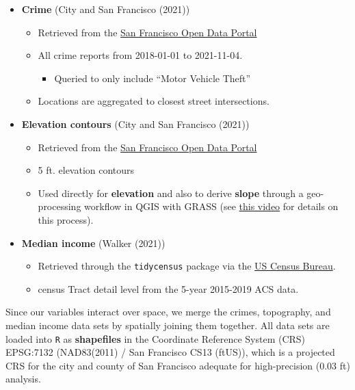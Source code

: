 \documentclass[
]{article}
\providecommand{\tightlist}{%
  \setlength{\itemsep}{0pt}\setlength{\parskip}{0pt}}
\begin{document}
\begin{itemize}
\tightlist
\item
  \textbf{Crime} (City and San Francisco (2021))

  \begin{itemize}
  \tightlist
  \item
    Retrieved from the
    \href{https://data.sfgov.org/Public-Safety/Police-Department-Incident-Reports-2018-to-Present/wg3w-h783}{San
    Francisco Open Data Portal}
  \item
    All crime reports from 2018-01-01 to 2021-11-04.

    \begin{itemize}
    \tightlist
    \item
      Queried to only include ``Motor Vehicle Theft''
    \end{itemize}
  \item
    Locations are aggregated to closest street intersections.
  \end{itemize}
\item
  \textbf{Elevation contours} (City and San Francisco (2021))

  \begin{itemize}
  \tightlist
  \item
    Retrieved from the
    \href{https://data.sfgov.org/Energy-and-Environment/Elevation-Contours/rnbg-2qxw}{San
    Francisco Open Data Portal}
  \item
    5 ft. elevation contours
  \item
    Used directly for \textbf{elevation} and also to derive
    \textbf{slope} through a geo-processing workflow in QGIS with GRASS
    (see \href{https://www.youtube.com/watch?v=MvnW6w1_yJg}{this video}
    for details on this process).
  \end{itemize}
\item
  \textbf{Median income} (Walker (2021))

  \begin{itemize}
  \tightlist
  \item
    Retrieved through the \texttt{tidycensus} package via the
    \href{https://www.census.gov/data/developers/data-sets.html}{US
    Census Bureau}.
  \item
    census Tract detail level from the 5-year 2015-2019 ACS data.
  \end{itemize}
\end{itemize}

Since our variables interact over space, we merge the crimes,
topography, and median income data sets by spatially joining them
together. All data sets are loaded into \texttt{R} as
\textbf{shapefiles} in the Coordinate Reference System (CRS) EPSG:7132
(NAD83(2011) / San Francisco CS13 (ftUS)), which is a projected CRS for
the city and county of San Francisco adequate for high-precision (0.03
ft) analysis.
\end{document}
